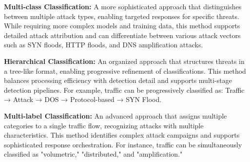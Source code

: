 \documentclass{report}
\begin{document}
\textbf{Multi-class Classification:} A more sophisticated approach that distinguishes between multiple attack types, enabling targeted responses for specific threats. While requiring more complex models and training data, this method supports detailed attack attribution and can differentiate between various attack vectors such as SYN floods, HTTP floods, and DNS amplification attacks.

\textbf{Hierarchical Classification:} An organized approach that structures threats in a tree-like format, enabling progressive refinement of classifications. This method balances processing efficiency with detection detail and supports multi-stage detection pipelines. For example, traffic can be progressively classified as: Traffic → Attack → DOS → Protocol-based → SYN Flood.

\textbf{Multi-label Classification:} An advanced approach that assigns multiple categories to a single traffic flow, recognizing attacks with multiple characteristics. This method identifies complex attack campaigns and supports sophisticated response orchestration. For instance, traffic can be simultaneously classified as "volumetric," "distributed," and "amplification."
  
  
\end{document}
